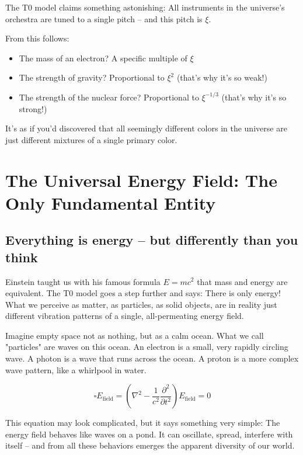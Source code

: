 \documentclass[12pt,a4paper]{article}
\newcommand{\xipar}{\ensuremath{\xi}}
\newcommand{\Efield}{E_\text{field}}
\begin{document}
	\begin{important}
		The T0 model claims something astonishing: All instruments in the universe's orchestra are tuned to a single pitch -- and this pitch is $\xipar$. 
		
		From this follows:
		\begin{itemize}
			\item The mass of an electron? A specific multiple of $\xipar$
			\item The strength of gravity? Proportional to $\xipar^2$ (that's why it's so weak!)
			\item The strength of the nuclear force? Proportional to $\xipar^{-1/3}$ (that's why it's so strong!)
		\end{itemize}
	\end{important}
	
	It's as if you'd discovered that all seemingly different colors in the universe are just different mixtures of a single primary color.
	
	\section{The Universal Energy Field: The Only Fundamental Entity}
	
	\subsection{Everything is energy -- but differently than you think}
	
	Einstein taught us with his famous formula $E = mc^2$ that mass and energy are equivalent. The T0 model goes a step further and says: There is only energy! What we perceive as matter, as particles, as solid objects, are in reality just different vibration patterns of a single, all-permeating energy field.
	
	Imagine empty space not as nothing, but as a calm ocean. What we call "particles" are waves on this ocean. An electron is a small, very rapidly circling wave. A photon is a wave that runs across the ocean. A proton is a more complex wave pattern, like a whirlpool in water.
	
	\begin{equation}
		\boxed{\square \Efield = \left(\nabla^2 - \frac{1}{c^2}\frac{\partial^2}{\partial t^2}\right) \Efield = 0}
	\end{equation}
	
	This equation may look complicated, but it says something very simple: The energy field behaves like waves on a pond. It can oscillate, spread, interfere with itself -- and from all these behaviors emerges the apparent diversity of our world.
	
\end{document}
